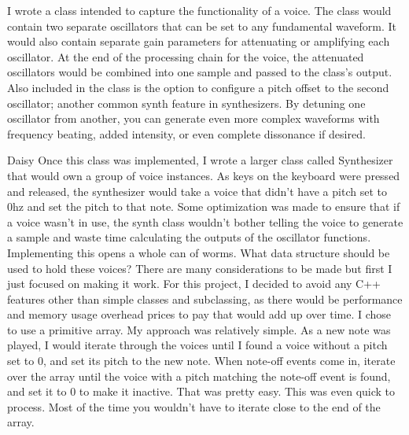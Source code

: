 \documentclass[acmlarge,screen]{acmart}
\begin{document}
I wrote a class intended to capture the functionality of a voice. The class would contain two separate oscillators that can be set to any fundamental waveform. It would also contain separate gain parameters for attenuating or amplifying each oscillator. At the end of the processing chain for the voice, the attenuated oscillators would be combined into one sample and passed to the class's output. Also included in the class is the option to configure a pitch offset to the second oscillator; another common synth feature in synthesizers. By detuning one oscillator from another, you can generate even more complex waveforms with frequency beating, added intensity, or even complete dissonance if desired.

Daisy
Once this class was implemented, I wrote a larger class called Synthesizer that would own a group of voice instances. As keys on the keyboard were pressed and released, the synthesizer would take a voice that didn't have a pitch set to 0hz and set the pitch to that note. Some optimization was made to ensure that if a voice wasn't in use, the synth class wouldn't bother telling the voice to generate a sample and waste time calculating the outputs of the oscillator functions. Implementing this opens a whole can of worms. What data structure should be used to hold these voices? There are many considerations to be made but first I just focused on making it work. For this project, I decided to avoid any C++ features other than simple classes and subclassing, as there would be performance and memory usage overhead prices to pay that would add up over time. I chose to use a primitive array. My approach was relatively simple. As a new note was played, I would iterate through the voices until I found a voice without a pitch set to 0, and set its pitch to the new note. When note-off events come in, iterate over the array until the voice with a pitch matching the note-off event is found, and set it to 0 to make it inactive. That was pretty easy. This was even quick to process. Most of the time you wouldn't have to iterate close to the end of the array.
\end{document}
